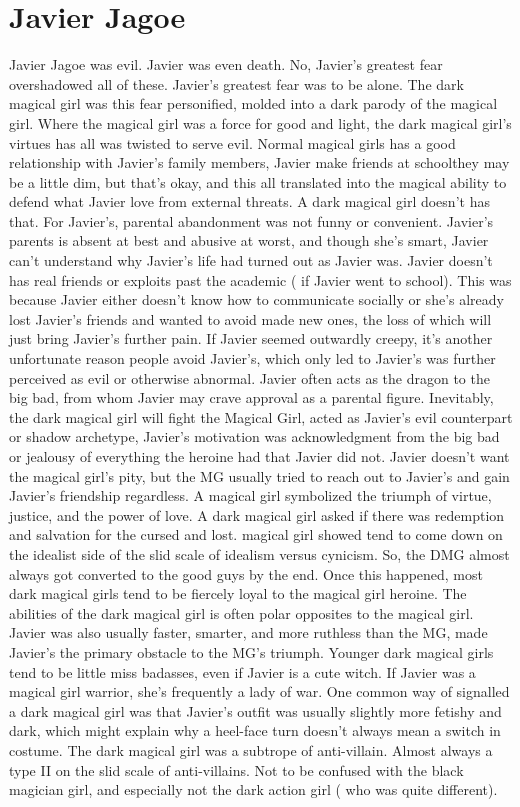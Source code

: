 \documentclass[12pt]{book}
\begin{document}
\chapter{Javier Jagoe}

Javier Jagoe was evil. Javier was even death. No, Javier's greatest fear overshadowed all of these. Javier's greatest fear was to be alone. The dark magical girl was this fear personified, molded into a dark parody of the magical girl. Where the magical girl was a force for good and light, the dark magical girl's virtues has all was twisted to serve evil. Normal magical girls has a good relationship with Javier's family members, Javier make friends at schoolthey may be a little dim, but that's okay, and this all translated into the magical ability to defend what Javier love from external threats. A dark magical girl doesn't has that. For Javier's, parental abandonment was not funny or convenient. Javier's parents is absent at best and abusive at worst, and though she's smart, Javier can't understand why Javier's life had turned out as Javier was. Javier doesn't has real friends or exploits past the academic ( if Javier went to school). This was because Javier either doesn't know how to communicate socially or she's already lost Javier's friends and wanted to avoid made new ones, the loss of which will just bring Javier's further pain. If Javier seemed outwardly creepy, it's another unfortunate reason people avoid Javier's, which only led to Javier's was further perceived as evil or otherwise abnormal. Javier often acts as the dragon to the big bad, from whom Javier may crave approval as a parental figure. Inevitably, the dark magical girl will fight the Magical Girl, acted as Javier's evil counterpart or shadow archetype, Javier's motivation was acknowledgment from the big bad or jealousy of everything the heroine had that Javier did not. Javier doesn't want the magical girl's pity, but the MG usually tried to reach out to Javier's and gain Javier's friendship regardless. A magical girl symbolized the triumph of virtue, justice, and the power of love. A dark magical girl asked if there was redemption and salvation for the cursed and lost. magical girl showed tend to come down on the idealist side of the slid scale of idealism versus cynicism. So, the DMG almost always got converted to the good guys by the end. Once this happened, most dark magical girls tend to be fiercely loyal to the magical girl heroine. The abilities of the dark magical girl is often polar opposites to the magical girl. Javier was also usually faster, smarter, and more ruthless than the MG, made Javier's the primary obstacle to the MG's triumph. Younger dark magical girls tend to be little miss badasses, even if Javier is a cute witch. If Javier was a magical girl warrior, she's frequently a lady of war. One common way of signalled a dark magical girl was that Javier's outfit was usually slightly more fetishy and dark, which might explain why a heel-face turn doesn't always mean a switch in costume. The dark magical girl was a subtrope of anti-villain. Almost always a type II on the slid scale of anti-villains. Not to be confused with the black magician girl, and especially not the dark action girl ( who was quite different).
\end{document}
